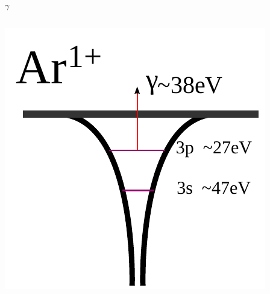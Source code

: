 \documentclass{beamer}
\begin{document}
\begin{frame}{$\gamma$}
\begin{columns}[t]
    \includegraphics[width=\textwidth]{figures/appendix/photo_ionization_Ar1p_3p}
\end{columns}


\end{frame}
\end{document}
